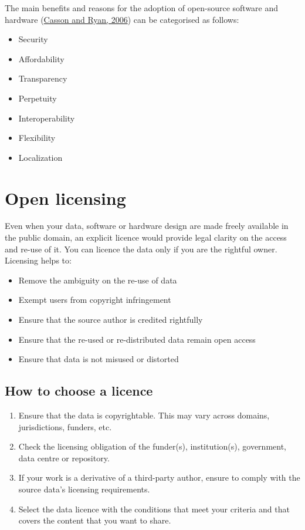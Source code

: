 \documentclass[
]{book}
\providecommand{\tightlist}{%
  \setlength{\itemsep}{0pt}\setlength{\parskip}{0pt}}
\begin{document}
The main benefits and reasons for the adoption of open-source software and hardware (\href{https://www.researchgate.net/publication/228296692_Open_Standards_Open_Source_Adoption_in_the_Public_Sector_and_Their_Relationship_to_Microsoft's_Market_Dominance}{Casson and Ryan, 2006}) can be categorised as follows:

\begin{itemize}
\tightlist
\item
  Security
\item
  Affordability
\item
  Transparency
\item
  Perpetuity
\item
  Interoperability
\item
  Flexibility
\item
  Localization
\end{itemize}

\hypertarget{open-licensing}{%
\section{Open licensing}\label{open-licensing}}

Even when your data, software or hardware design are made freely available in the public domain, an explicit licence would provide legal clarity on the access and re-use of it. You can licence the data only if you are the rightful owner. Licensing helps to:

\begin{itemize}
\tightlist
\item
  Remove the ambiguity on the re-use of data
\item
  Exempt users from copyright infringement
\item
  Ensure that the source author is credited rightfully
\item
  Ensure that the re-used or re-distributed data remain open access
\item
  Ensure that data is not misused or distorted
\end{itemize}

\hypertarget{how-to-choose-a-licence}{%
\subsection*{How to choose a licence}\label{how-to-choose-a-licence}}

\begin{enumerate}
\def\labelenumi{\arabic{enumi}.}
\tightlist
\item
  Ensure that the data is copyrightable. This may vary across domains, jurisdictions, funders, etc.
\item
  Check the licensing obligation of the funder(s), institution(s), government, data centre or repository.
\item
  If your work is a derivative of a third-party author, ensure to comply with the source data's licensing requirements.
\item
  Select the data licence with the conditions that meet your criteria and that covers the content that you want to share.
\end{enumerate}
\end{document}
